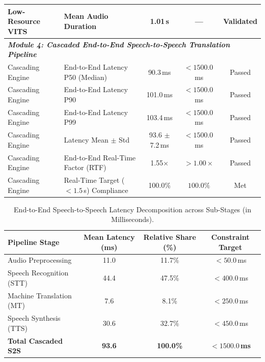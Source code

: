 \begin{table}[t]
\begin{tabular}{llccc}
\quad Low-Resource VITS & Mean Audio Duration & 1.01\,s & --- & Validated \\
\midrule
\multicolumn{5}{l}{\textit{\textbf{Module 4: Cascaded End-to-End Speech-to-Speech Translation Pipeline}}} \\
\quad Cascading Engine & End-to-End Latency P50 (Median) & 90.3\,ms & $< 1500.0\,$ms & Passed \\
\quad Cascading Engine & End-to-End Latency P90 & 101.0\,ms & $< 1500.0\,$ms & Passed \\
\quad Cascading Engine & End-to-End Latency P99 & 103.4\,ms & $< 1500.0\,$ms & Passed \\
\quad Cascading Engine & Latency Mean $\pm$ Std & 93.6 $\pm$ 7.2\,ms & $< 1500.0\,$ms & Passed \\
\quad Cascading Engine & End-to-End Real-Time Factor (RTF) & 1.55$\times$ & $> 1.00\times$ & Passed \\
\quad Cascading Engine & Real-Time Target ($< 1.5$\,s) Compliance & 100.0\% & $100.0\%$ & Met \\
\bottomrule
\end{tabular}
\end{table}

\begin{table}[htbp]
\centering
\caption{End-to-End Speech-to-Speech Latency Decomposition across Sub-Stages (in Milliseconds).}
\label{tab:latency_decomposition}
\small
\begin{tabular}{lccc}
\toprule
\textbf{Pipeline Stage} & \textbf{Mean Latency (ms)} & \textbf{Relative Share (\%)} & \textbf{Constraint Target} \\
\midrule
Audio Preprocessing & 11.0 & 11.7\% & $< 50.0\,$ms \\
Speech Recognition (STT) & 44.4 & 47.5\% & $< 400.0\,$ms \\
Machine Translation (MT) & 7.6 & 8.1\% & $< 250.0\,$ms \\
Speech Synthesis (TTS) & 30.6 & 32.7\% & $< 450.0\,$ms \\
\midrule
\textbf{Total Cascaded S2S} & \textbf{93.6} & \textbf{100.0\%} & \textbf{$< 1500.0\,$ms} \\
\bottomrule
\end{tabular}
\end{table}
